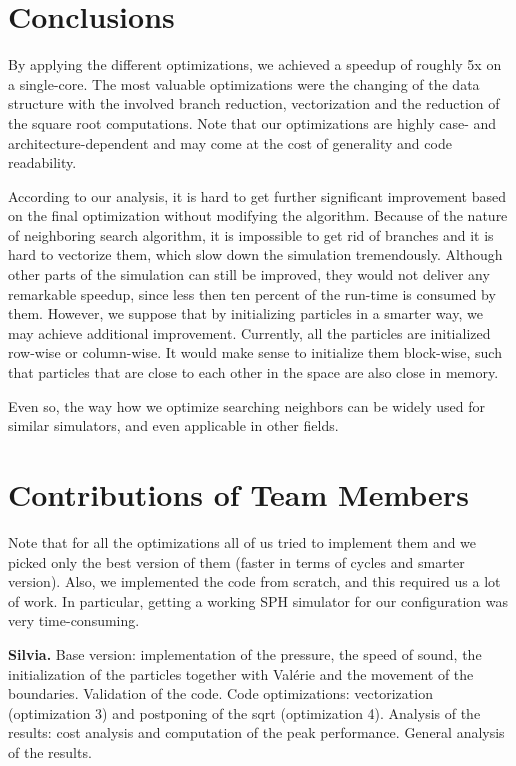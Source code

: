 \documentclass[letterpaper]{article}
\newcommand{\mypar}[1]{{\bf #1.}}
\begin{document}
\section{Conclusions}\label{sec:conclusions}
By applying the different optimizations, we achieved a speedup of roughly 5x on a single-core. 
The most valuable optimizations were the changing of the data structure with the involved branch reduction, vectorization and the reduction of the square root computations. Note that our optimizations are highly case- and architecture-dependent and may come at the cost of generality and code readability.

According to our analysis, it is hard to get further significant improvement based on the final optimization without modifying the algorithm. Because of the nature of neighboring search algorithm, it is impossible to get rid of branches and it is hard to vectorize them, which slow down the simulation tremendously. Although other parts of the simulation can still be improved, they would not deliver any remarkable speedup, since less then ten percent of the run-time is consumed by them. However, we suppose that by initializing particles in a smarter way, we may achieve additional improvement. Currently, all the particles are initialized row-wise or column-wise. It would make sense to initialize them block-wise, such that particles that are close to each other in the space are also close in memory.

Even so, the way how we optimize searching neighbors can be widely used for similar simulators, and even applicable in other fields.
\section{Contributions of Team Members}
Note that for all the optimizations all of us tried to implement them and we picked only the best version of them (faster in terms of cycles and smarter version).
Also, we implemented the code from scratch, and this required us a lot of work. In particular, getting a working SPH simulator for our configuration was very time-consuming.

\mypar{Silvia} 
Base version: implementation of the pressure, the speed of sound, the initialization of the particles together with Valérie and the movement of the boundaries. Validation of the code. 
Code optimizations: vectorization (optimization 3) and postponing of the sqrt (optimization 4). Analysis of the results: cost analysis and computation of the peak performance. General analysis of the results.
\end{document}
